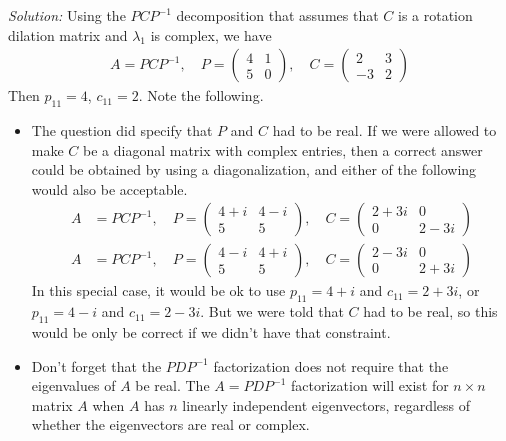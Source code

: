 \begin{parts}
        \ifnum {} {\color{DarkBlue} \textit{Solution:} Using the $PCP^{-1}$ decomposition that assumes that $C$ is a rotation dilation matrix and $\lambda_1$ is complex, we have 
        \begin{align}
            A=PCP^{-1}, \quad P = \begin{pmatrix} 4&1\\5&0\end{pmatrix}, \quad C=\begin{pmatrix} 2&3\\-3&2\end{pmatrix}
        \end{align}
        Then $p_{11} = 4$, $c_{11} = 2$. Note the following. 
        \begin{itemize}
            \item The question did specify that $P$ and $C$ had to be real. If we were allowed to make $C$ be a diagonal matrix with complex entries, then a correct answer could be obtained by using a diagonalization, and either of the following would also be acceptable. 
        \begin{align}
            A&=PCP^{-1}, \quad P = \begin{pmatrix} 4+i&4-i\\5&5\end{pmatrix}, \quad C = \begin{pmatrix} 2+3i&0\\0&2-3i \end{pmatrix} \\
            A&=PCP^{-1}, \quad P = \begin{pmatrix} 4-i&4+i\\5&5\end{pmatrix}, \quad C= \begin{pmatrix} 2-3i&0\\0&2+3i \end{pmatrix} 
        \end{align}
        In this special case, it would be ok to use $p_{11} = 4+i$ and $c_{11} = 2+3i$, or $p_{11} = 4-i$ and $c_{11} = 2-3i$. But we were told that $C$ had to be real, so this would be only be correct if we didn't have that constraint. 
            \item Don't forget that the $PDP^{-1}$ factorization does not require that the eigenvalues of $A$ be real. The $A=PDP^{-1}$ factorization will exist for $n\times n$ matrix $A$ when $A$ has $n$ linearly independent eigenvectors, regardless of whether the eigenvectors are real or complex. 

\end{itemize}}
\end{parts}

